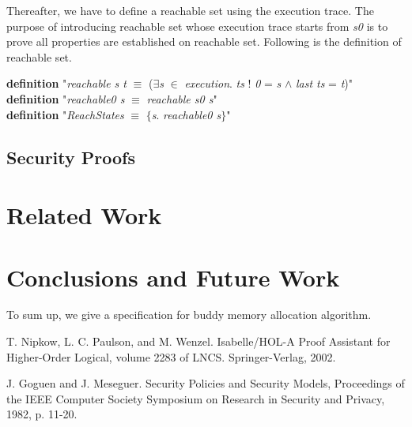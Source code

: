 \documentclass[runningheads]{llncs}
\begin{document}
Thereafter, we have to define a reachable set using the execution trace. The purpose of introducing reachable set whose execution trace starts from \textsl{s0} is to prove all properties are established on reachable set. Following is the definition of reachable set.

\phantom{x} \textbf{definition} "\textsl{reachable s t} $\equiv$ ($\exists$\textsl{s} $\in$ \textsl{execution}. \textsl{ts} ! \textsl{0} = \textsl{s} $\wedge$ \textsl{last ts} = \textsl{t})" \\
\phantom{x} \hspace{3pt} \textbf{definition} "\textsl{reachable0 s} $\equiv$ \textsl{reachable s0 s}" \\
\phantom{x} \hspace{3pt} \textbf{definition} "\textsl{ReachStates} $\equiv$ $\lbrace$\textsl{s}. \textsl{reachable0 s}$\rbrace$"


\subsection{Security Proofs}


\section{Related Work}


\section{Conclusions and Future Work}
To sum up, we give a specification for buddy memory allocation algorithm. 

\begin{thebibliography}{8}
T. Nipkow, L. C. Paulson, and M. Wenzel. Isabelle/HOL-A Proof Assistant for Higher-Order Logical, volume 2283 of LNCS. Springer-Verlag, 2002.

J. Goguen and J. Meseguer. Security Policies and Security Models, Proceedings of the IEEE Computer Society Symposium on Research in Security and Privacy, 1982, p. 11-20.


\end{thebibliography}
\end{document}
